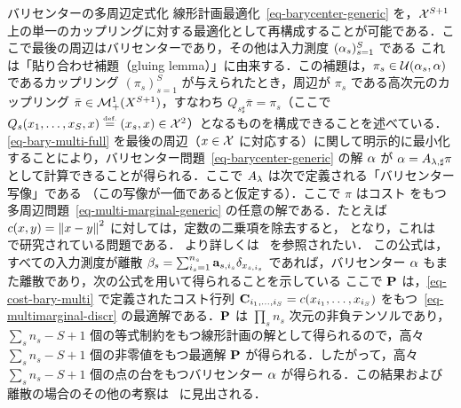 \begin{rem2}{バリセンターの多周辺定式化}\label{eq-multimarg-bary}
	線形計画最適化~\eqref{eq-barycenter-generic} を，$\X^{S+1}$ 上の単一のカップリングに対する最適化として再構成することが可能である．ここで最後の周辺はバリセンターであり，その他は入力測度 $(\al_s)_{s=1}^S$ である
	これは「貼り合わせ補題（gluing lemma）」に由来する．この補題は，$\pi_s \in \Couplings(\al_s,\al)$ であるカップリング $(\pi_s)_{s=1}^S$ が与えられたとき，周辺が $\pi_s$ である高次元のカップリング $\bar \pi \in \Mm_+^1(X^{S+1})$，すなわち $Q_{s\sharp}\bar\pi=\pi_s$（ここで $Q_s(x_1,\ldots,x_S,x) \eqdef (x_s,x) \in \X^2$）となるものを構成できることを述べている．
	\eqref{eq-bary-multi-full} を最後の周辺（$x \in \X$ に対応する）に関して明示的に最小化することにより，バリセンター問題~\eqref{eq-barycenter-generic} の解 $\al$ が $\al = A_{\la,\sharp} \pi$ として計算できることが得られる．ここで $A_\la$ は次で定義される「バリセンター写像」である
	（この写像が一価であると仮定する）．ここで $\pi$ はコスト
	をもつ多周辺問題~\eqref{eq-multi-marginal-generic} の任意の解である．たとえば $c(x,y)=\norm{x-y}^2$ に対しては，定数の二乗項を除去すると，
	となり，これは~\citet{GangboSciech} で研究されている問題である．
	より詳しくは~\citet{Carlier_wasserstein_barycenter} を参照されたい．
	この公式は，すべての入力測度が離散 $\be_s = \sum_{i_s=1}^{n_s} \a_{s,i_s} \de_{x_{s,i_s}}$ であれば，バリセンター $\al$ もまた離散であり，次の公式を用いて得られることを示している
	ここで $\P$ は，\eqref{eq-cost-bary-multi} で定義されたコスト行列 $\C_{i_1,\ldots,i_S} = c(x_{i_1},\ldots,x_{i_S})$ をもつ~\eqref{eq-multimarginal-discr} の最適解である．$\P$ は $\prod_s n_s$ 次元の非負テンソルであり，$\sum_s n_s-S+1$ 個の等式制約をもつ線形計画の解として得られるので，高々 $\sum_s n_s-S+1$ 個の非零値をもつ最適解 $\P$ が得られる．したがって，高々 $\sum_s n_s-S+1$ 個の点の台をもつバリセンター $\al$ が得られる．この結果および離散の場合のその他の考察は~\citet{anderes2016discrete} に見出される．
\end{rem2}

